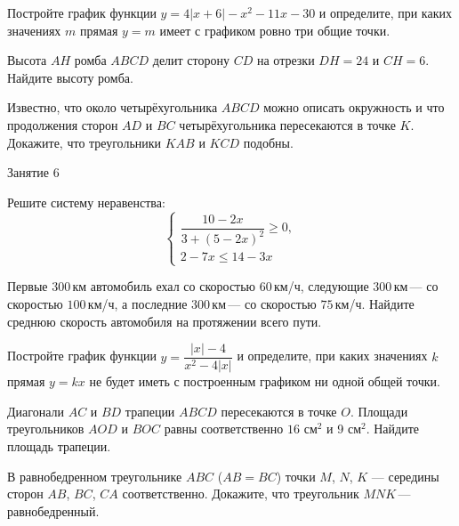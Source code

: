 \begin{class}[number=5]
\begin{listofex}
		\item Постройте график функции \( y=4|x+6|-x^2-11x-30 \) и определите, при каких значениях \( m \)	прямая \( y=m \) имеет с графиком ровно три общие точки.
		\item Высота \( AH \) ромба \( ABCD \) делит сторону \( CD \) на отрезки \( DH=24 \) и \( CH=6 \). Найдите высоту ромба.
		\item Известно, что около четырёхугольника \( ABCD \) можно описать окружность и что продолжения сторон \( AD \) и \( BC \) четырёхугольника пересекаются в точке \( K \). Докажите, что треугольники \( KAB \) и \( KCD \) подобны.
	\end{listofex}
\end{class}

\begin{class}[number=6]
	\begin{listofex}
		\item Занятие 6
	\end{listofex}
\end{class}

\begin{homework}[number=3]
	\begin{listofex}
		\item Решите систему неравенства:
		\[\begin{cases} \dfrac{10-2x}{3+(5-2x)^2}\ge0,\\2-7x\le14-3x \end{cases}\]
		\item Первые \( 300 \) км автомобиль ехал со скоростью \( 60 \) км/ч, следующие \( 300 \) км --- со скоростью \( 100 \) км/ч, а последние \( 300 \) км --- со скоростью \( 75 \) км/ч. Найдите среднюю скорость автомобиля на протяжении всего пути.
		\item Постройте график функции \( y=\dfrac{|x|-4}{x^2-4|x|} \) и определите, при каких значениях \( k \) прямая \( y=kx \) не будет иметь с построенным графиком ни одной общей точки.
		\item Диагонали \( AC \) и \( BD \) трапеции \( ABCD \) пересекаются в точке \( O \). Площади треугольников \( AOD \) и \( BOC \) равны соответственно \( 16 \) см\( ^2 \)  и 9 см\( ^2 \). Найдите площадь трапеции.
		\item В равнобедренном треугольнике \( ABC \) (\( AB=BC \)) точки \( M \), \( N \), \( K \) --- середины сторон \( AB \), \( BC \), \( CA \) соответственно. Докажите, что треугольник \( MNK \) --- равнобедренный.
	\end{listofex}
\end{homework}

